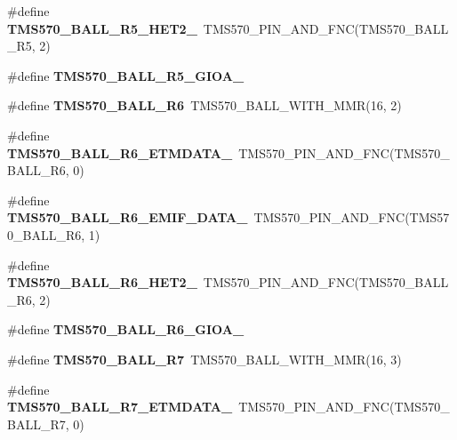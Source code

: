 \begin{DoxyCompactItemize}
\#define {\bfseries T\+M\+S570\+\_\+\+B\+A\+L\+L\+\_\+\+R5\+\_\+\+H\+E\+T2\+\_}~T\+M\+S570\+\_\+\+P\+I\+N\+\_\+\+A\+N\+D\+\_\+\+F\+NC(T\+M\+S570\+\_\+\+B\+A\+L\+L\+\_\+\+R5, 2)
\item 
\#define {\bfseries T\+M\+S570\+\_\+\+B\+A\+L\+L\+\_\+\+R5\+\_\+\+G\+I\+O\+A\+\_}
\item 
\mbox{\label{tms570lc4357-pins_8h_a4945db79045a394c68189f740ac3d839}} 
\#define {\bfseries T\+M\+S570\+\_\+\+B\+A\+L\+L\+\_\+\+R6}~T\+M\+S570\+\_\+\+B\+A\+L\+L\+\_\+\+W\+I\+T\+H\+\_\+\+M\+MR(16, 2)
\item 
\mbox{\label{tms570lc4357-pins_8h_aacf38b266de3c50fe95ce8401f683650}} 
\#define {\bfseries T\+M\+S570\+\_\+\+B\+A\+L\+L\+\_\+\+R6\+\_\+\+E\+T\+M\+D\+A\+T\+A\+\_}~T\+M\+S570\+\_\+\+P\+I\+N\+\_\+\+A\+N\+D\+\_\+\+F\+NC(T\+M\+S570\+\_\+\+B\+A\+L\+L\+\_\+\+R6, 0)
\item 
\mbox{\label{tms570lc4357-pins_8h_a2112efbee82f681b13f2c8ef0db72b69}} 
\#define {\bfseries T\+M\+S570\+\_\+\+B\+A\+L\+L\+\_\+\+R6\+\_\+\+E\+M\+I\+F\+\_\+\+D\+A\+T\+A\+\_}~T\+M\+S570\+\_\+\+P\+I\+N\+\_\+\+A\+N\+D\+\_\+\+F\+NC(T\+M\+S570\+\_\+\+B\+A\+L\+L\+\_\+\+R6, 1)
\item 
\mbox{\label{tms570lc4357-pins_8h_a84c321bf50d81beea5d4bbc0b0b47404}} 
\#define {\bfseries T\+M\+S570\+\_\+\+B\+A\+L\+L\+\_\+\+R6\+\_\+\+H\+E\+T2\+\_}~T\+M\+S570\+\_\+\+P\+I\+N\+\_\+\+A\+N\+D\+\_\+\+F\+NC(T\+M\+S570\+\_\+\+B\+A\+L\+L\+\_\+\+R6, 2)
\item 
\#define {\bfseries T\+M\+S570\+\_\+\+B\+A\+L\+L\+\_\+\+R6\+\_\+\+G\+I\+O\+A\+\_}
\item 
\mbox{\label{tms570lc4357-pins_8h_ac563685f12bde843205703eafec18208}} 
\#define {\bfseries T\+M\+S570\+\_\+\+B\+A\+L\+L\+\_\+\+R7}~T\+M\+S570\+\_\+\+B\+A\+L\+L\+\_\+\+W\+I\+T\+H\+\_\+\+M\+MR(16, 3)
\item 
\mbox{\label{tms570lc4357-pins_8h_ab460d5b562af535b1b3542f63458f189}} 
\#define {\bfseries T\+M\+S570\+\_\+\+B\+A\+L\+L\+\_\+\+R7\+\_\+\+E\+T\+M\+D\+A\+T\+A\+\_}~T\+M\+S570\+\_\+\+P\+I\+N\+\_\+\+A\+N\+D\+\_\+\+F\+NC(T\+M\+S570\+\_\+\+B\+A\+L\+L\+\_\+\+R7, 0)
\item 

\end{DoxyCompactItemize}
